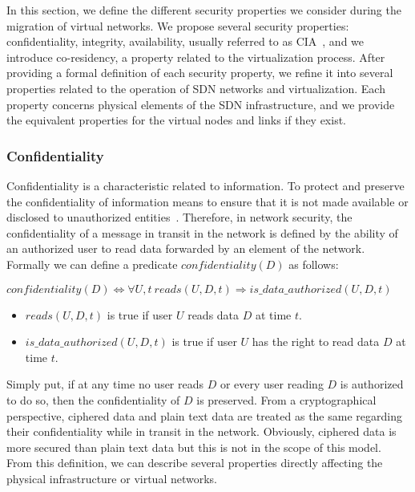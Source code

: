 \label{sec:security_prop}
In this section, we define the different security properties we consider during the migration of virtual networks.
We propose several security properties: confidentiality, integrity, availability, usually referred to as CIA~\cite{ISO/IEC270012013}, and we introduce co-residency, a property related to the virtualization process.
After providing a formal definition of each security property, we refine it into several properties related to the operation of SDN networks and virtualization. Each property concerns physical elements of the SDN infrastructure, and we provide the equivalent properties for the virtual nodes and links if they exist. 

\subsubsection{Confidentiality}
\label{sec:prop-conf}
Confidentiality is a characteristic related to information.
To protect and preserve the confidentiality of information means to ensure that it is not made available or disclosed to unauthorized entities~\cite{ISO/IEC270012013}.
Therefore, in network security, the confidentiality of a message in transit in the network is defined by the ability of an authorized  user to read data forwarded by an element of the network.
Formally we can define a predicate $confidentiality(D)$ as follows:

\begin{myformula}
$ confidentiality(D) \Leftrightarrow \forall U,t~reads(U,D,t) \Rightarrow is\_data\_authorized(U,D,t)$
\end{myformula}

\begin{itemize}
\item $reads(U,D,t)$ is true if user $U$ reads data $D$ at time $t$.
\item $is\_data\_authorized(U,D,t)$ is true if user $U$ has the right to read data $D$ at time $t$.
\end{itemize}
Simply put, if at any time no user reads $D$ or every user reading $D$ is authorized to do so, then the confidentiality of $D$ is preserved.
From a cryptographical perspective, ciphered data and plain text data are treated as the same regarding their confidentiality while in transit in the network.
Obviously, ciphered data is more secured than plain text data but this is not in the scope of this model.\\
From this definition, we can describe several properties directly affecting the physical infrastructure or virtual networks.


